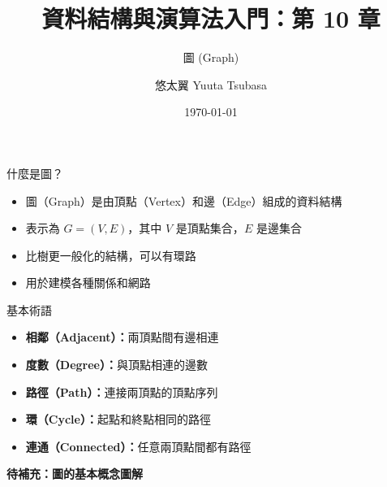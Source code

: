 \documentclass{beamer}
\begin{document}
\title{資料結構與演算法入門：第 10 章}
\subtitle{圖 (Graph)}
\author{悠太翼 Yuuta Tsubasa}
\date{\today}

\frame{\titlepage}

\begin{frame}{什麼是圖？}
\begin{itemize}
    \item 圖（Graph）是由頂點（Vertex）和邊（Edge）組成的資料結構
    \item 表示為 $G = (V, E)$，其中 $V$ 是頂點集合，$E$ 是邊集合
    \item 比樹更一般化的結構，可以有環路
    \item 用於建模各種關係和網路
\end{itemize}

\vspace{1em}
\begin{block}{基本術語}
\begin{itemize}
    \item \textbf{相鄰（Adjacent）：}兩頂點間有邊相連
    \item \textbf{度數（Degree）：}與頂點相連的邊數
    \item \textbf{路徑（Path）：}連接兩頂點的頂點序列
    \item \textbf{環（Cycle）：}起點和終點相同的路徑
    \item \textbf{連通（Connected）：}任意兩頂點間都有路徑
\end{itemize}
\end{block}

\vspace{1em}
\begin{center}
\textbf{待補充：圖的基本概念圖解}
\end{center}
\end{frame}
\end{document}
